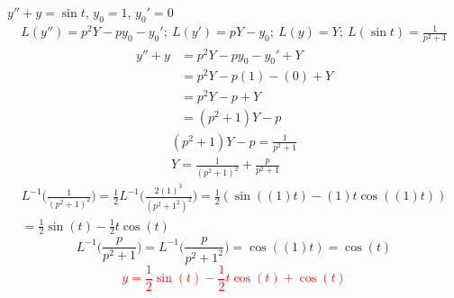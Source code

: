 \item [4.] $y''+y=\sin t$, $y_0=1$, $y_0'=0$
\begin{gather*}
    L(y'')=p^2Y-py_0-y_0';\:
    L(y')=pY-y_0;\:
    L(y)=Y;\:
    L(\sin t)=\frac{1}{p^2+1}
\end{gather*}
\begin{align*}
    y''+y
    &=p^2Y-py_0-y_0'+Y\\
    &=p^2Y-p(1)-(0)+Y\\
    &=p^2Y-p+Y\\
    &=(p^2+1)Y-p
\end{align*}
\begin{gather*}
    (p^2+1)Y-p=\frac{1}{p^2+1}\\
    Y=\frac{1}{(p^2+1)^2}+\frac{p}{p^2+1}
\end{gather*}
\begin{gather*}
    L^{-1}\Bigg(\frac{1}{(p^2+1)^2}\Bigg) 
    = \frac{1}{2}L^{-1}\Bigg(\frac{2(1)^3}{(p^2+1^2)^2}\Bigg) 
    =\frac{1}{2}(\sin((1)t) - (1)t \cos((1)t))\\
    =\frac{1}{2}\sin(t) - \frac{1}{2}t\cos(t)
    \tag{By \( L17 \)}
\end{gather*}
\begin{equation*}
    L^{-1}\Bigg(\frac{p}{p^2+1}\Bigg) 
    = L^{-1}\Bigg(\frac{p}{p^2+1^2}\Bigg)
    = \cos((1)t)
    =\cos(t)
    \tag{By \( L4 \)}
\end{equation*}
\textcolor{red}{\[
   y= \frac{1}{2}\sin(t) - \frac{1}{2}t\cos(t)+\cos(t)
\]}